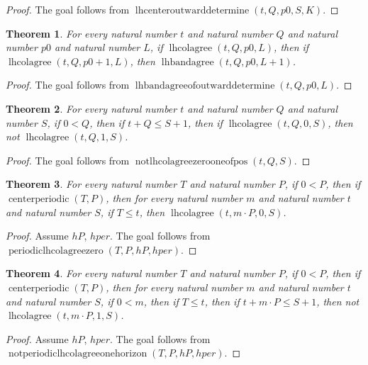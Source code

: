 \documentclass[11pt]{article}
\newtheorem{theorem}{Theorem}[section]
\theoremstyle{definition}
\begin{document}
\begin{proof}
The goal follows from \(\operatorname{lhcenteroutwarddetermine}(t, Q, p0, S, K)\).
\end{proof}
\begin{theorem}
\label{ll:paper:lhbandagree-of-outward-determine}
For every natural number \(t\) and natural number \(Q\) and natural number \(p0\) and natural number \(L\), if \(\operatorname{lhcolagree}(t, Q, p0, L)\), then if \(\operatorname{lhcolagree}(t, Q, p0 + 1, L)\), then \(\operatorname{lhbandagree}(t, Q, p0, L + 1)\).
\end{theorem}
\begin{proof}
The goal follows from \(\operatorname{lhbandagreeofoutwarddetermine}(t, Q, p0, L)\).
\end{proof}
\begin{theorem}
\label{ll:paper:not-lhcolagree-zero-one-of-pos}
For every natural number \(t\) and natural number \(Q\) and natural number \(S\), if \(0 < Q\), then if \(t + Q \le S + 1\), then if \(\operatorname{lhcolagree}(t, Q, 0, S)\), then not \(\operatorname{lhcolagree}(t, Q, 1, S)\).
\end{theorem}
\begin{proof}
The goal follows from \(\operatorname{notlhcolagreezerooneofpos}(t, Q, S)\).
\end{proof}
\begin{theorem}
\label{ll:paper:periodic-lhcolagree-zero}
For every natural number \(T\) and natural number \(P\), if \(0 < P\), then if \(\operatorname{centerperiodic}(T, P)\), then for every natural number \(m\) and natural number \(t\) and natural number \(S\), if \(T \le t\), then \(\operatorname{lhcolagree}(t, m \cdot P, 0, S)\).
\end{theorem}
\begin{proof}
Assume \(hP\), \(hper\).
The goal follows from \(\operatorname{periodiclhcolagreezero}(T, P, hP, hper)\).
\end{proof}
\begin{theorem}
\label{ll:paper:not-periodic-lhcolagree-one-horizon}
For every natural number \(T\) and natural number \(P\), if \(0 < P\), then if \(\operatorname{centerperiodic}(T, P)\), then for every natural number \(m\) and natural number \(t\) and natural number \(S\), if \(0 < m\), then if \(T \le t\), then if \(t + m \cdot P \le S + 1\), then not \(\operatorname{lhcolagree}(t, m \cdot P, 1, S)\).
\end{theorem}
\begin{proof}
Assume \(hP\), \(hper\).
The goal follows from \(\operatorname{notperiodiclhcolagreeonehorizon}(T, P, hP, hper)\).
\end{proof}
\end{document}
